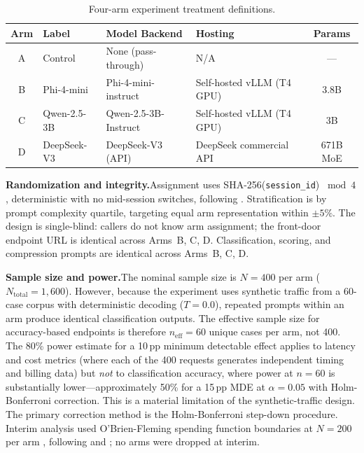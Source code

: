 \documentclass{article}
\begin{document}
\begin{table}[htbp]
\centering
\caption{Four-arm experiment treatment definitions.}
\label{tab:arms}
\begin{tabular}{clllc}
\toprule
Arm & Label & Model Backend & Hosting & Params \\
\midrule
A & Control & None (pass-through) & N/A & --- \\
B & Phi-4-mini & Phi-4-mini-instruct & Self-hosted vLLM (T4 GPU) & 3.8B \\
C & Qwen-2.5-3B & Qwen-2.5-3B-Instruct & Self-hosted vLLM (T4 GPU) & 3B \\
D & DeepSeek-V3 & DeepSeek-V3 (API) & DeepSeek commercial API & 671B MoE \\
\bottomrule
\end{tabular}
\end{table}

\textbf{Randomization and integrity.}\quad Assignment uses SHA-256(\texttt{session\_id}) $\bmod 4$, deterministic with no mid-session switches, following \citet{kohavi2020trustworthy}. Stratification is by prompt complexity quartile, targeting equal arm representation within $\pm 5\%$. The design is single-blind: callers do not know arm assignment; the front-door endpoint URL is identical across Arms~B, C, D. Classification, scoring, and compression prompts are identical across Arms~B, C, D.

\textbf{Sample size and power.}\quad The nominal sample size is $N = 400$ per arm ($N_{\text{total}} = 1{,}600$). However, because the experiment uses synthetic traffic from a 60-case corpus with deterministic decoding ($T = 0.0$), repeated prompts within an arm produce identical classification outputs. The effective sample size for accuracy-based endpoints is therefore $n_{\text{eff}} = 60$ unique cases per arm, not 400. The 80\% power estimate for a 10\,pp minimum detectable effect applies to latency and cost metrics (where each of the 400 requests generates independent timing and billing data) but \emph{not} to classification accuracy, where power at $n = 60$ is substantially lower---approximately 50\% for a 15\,pp MDE at $\alpha = 0.05$ with Holm-Bonferroni correction. This is a material limitation of the synthetic-traffic design. The primary correction method is the Holm-Bonferroni step-down procedure. Interim analysis used O'Brien-Fleming spending function boundaries at $N = 200$ per arm \citep{obrien1979}, following \citet{wald1945} and \citet{johari2017peeking}; no arms were dropped at interim.
\end{document}

